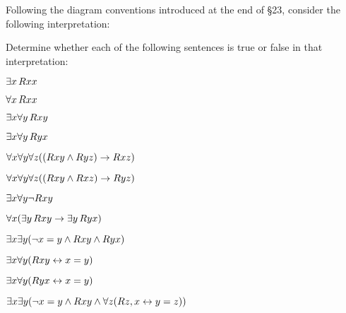 \begin{practiceproblems}
\problempart
\label{pr.TorF3}
Following the diagram conventions introduced at the end of \S23, consider the following interpretation:	
\begin{center}
\end{center}
Determine whether each of the following sentences is true or false in that interpretation:
\begin{earg}
\item $\exists x\,\mathord{R}x x$ \hfill {}
\item $\forall x\,\mathord{R}x x$ \hfill {}
\item $\exists x \forall y\,\mathord{R}x y$ \hfill {}
\item $\exists x \forall y\,\mathord{R}y x$ \hfill {}
\item $\forall x \forall y \forall z ((\mathord{R}x y \mathbin{\wedge} \mathord{R}y z) \rightarrow \mathord{R}x z)$ \hfill {}
\item $\forall x \forall y \forall z ((\mathord{R}x y \mathbin{\wedge} \mathord{R}x z) \rightarrow \mathord{R}y z)$ \hfill {}
\item $\exists x \forall y \neg \mathord{R}x y$ \hfill {}
\item $\forall x(\exists y\,\mathord{R}x y \rightarrow \exists y\,\mathord{R}y x)$ \hfill {}
\item $\exists x \exists y (\neg x = y \mathbin{\wedge} \mathord{R}x y \mathbin{\wedge} \mathord{R}y x)$ \hfill {}
\item $\exists x \forall y(\mathord{R}x y \leftrightarrow x = y)$ \hfill {}
\item $\exists x \forall y(\mathord{R}y x \leftrightarrow x = y)$ \hfill {}
\item $\exists x \exists y(\neg x = y \mathbin{\wedge} \mathord{R}x y \mathbin{\wedge} \forall z(\mathord{R}z,x \leftrightarrow y = z))$ \hfill {}
\end{earg}
\end{practiceproblems}

